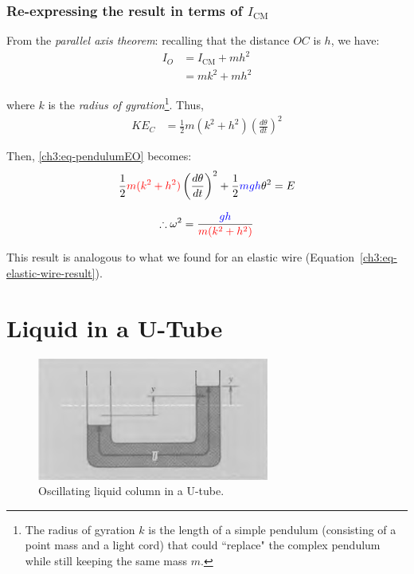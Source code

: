 \subsubsection{Re-expressing the result in terms of $I_\text{CM}$}
From the \emph{parallel axis theorem}: recalling that the distance $OC$ is $h$, we have:
\begin{align*}
	I_O &= I_\text{CM} + mh^2 \\
	&= mk^2 + mh^2
\end{align*}

where $k$ is the \emph{radius of gyration}\footnote{The radius of gyration $k$ is the length of a simple pendulum (consisting of a point mass and a light cord) that could ``replace" the complex pendulum while still keeping the same mass $m$.}. Thus,
\begin{align*}
	KE_C %
	&= \frac{1}{2} m(k^2 + h^2 ) \left( \frac{d\theta}{dt} \right)^2
\end{align*}

Then, \eqref{ch3:eq-pendulumEO} becomes:
\[ \frac{1}{2} \textcolor{red}{m(k^2+h^2)} \left( \frac{d\theta}{dt} \right)^2  + \frac{1}{2} \textcolor{blue}{mgh}\theta^2 = E \]

\begin{equation*}
	\therefore \omega^2 = \frac{\textcolor{blue}{gh}}{\textcolor{red}{m(k^2+h^2)}}
\end{equation*}

This result is analogous to what we found for an elastic wire (Equation~\ref{ch3:eq-elastic-wire-result}).

\section{Liquid in a U-Tube} \label{ch3:sec-uTube}

\begin{figure}[h]
	\centering
	\includegraphics[scale=0.8]{phys232/Ch3-utube.png} \caption{Oscillating liquid column in a U-tube.}\label{ch3:fig-utube}
\end{figure}

